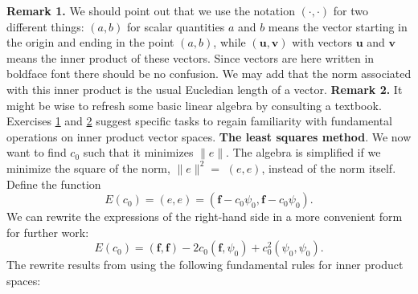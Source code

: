 \documentclass[../main.tex]{subfiles}
\begin{document}
	\noindent \textbf{Remark 1.} We should point out that we use the notation $(\cdot, \cdot)$ for two different things: $(a, b)$ for scalar quantities $a$ and $b$ means the vector starting in the origin and ending in the point $(a, b)$, while $(\boldsymbol{u}, \boldsymbol{v})$ with vectors $\boldsymbol{u}$ and $\boldsymbol{v}$ means the inner product of these vectors. Since vectors are here written in boldface font there should be no confusion. We may add that the norm associated with this inner product is the usual Eucledian length of a vector.
	\bigbreak
	\noindent \textbf{Remark 2.} It might be wise to refresh some basic linear algebra by consulting a textbook. Exercises \hyperref[sec:sec_10_1]{1} and \hyperref[sec:sec_10_1]{2} suggest specific tasks to regain familiarity with fundamental operations on inner product vector spaces.
	\bigbreak
	\noindent \textbf{The least squares method}. We now want to find $c_{0}$ such that it minimizes $\|e\|$. The algebra is simplified if we minimize the square of the norm, $\|e\|^{2}=$ $(e, e)$, instead of the norm itself. Define the function
	\begin{equation}\label{eqa4}
		E\left(c_{0}\right)=(e, e)=\left(\boldsymbol{f}-c_{0} \psi_{0}, \boldsymbol{f}-c_{0} \psi_{0}\right).
	\end{equation}
	We can rewrite the expressions of the right-hand side in a more convenient form for further work:
	\begin{equation}
		\label{eqa5}
		E\left(c_{0}\right)=(\boldsymbol{f}, \boldsymbol{f})-2 c_{0}\left(\boldsymbol{f}, \psi_{0}\right)+c_{0}^{2}\left(\psi_{0}, \psi_{0}\right).
	\end{equation}
	The rewrite results from using the following fundamental rules for inner product spaces:
	
\end{document}
